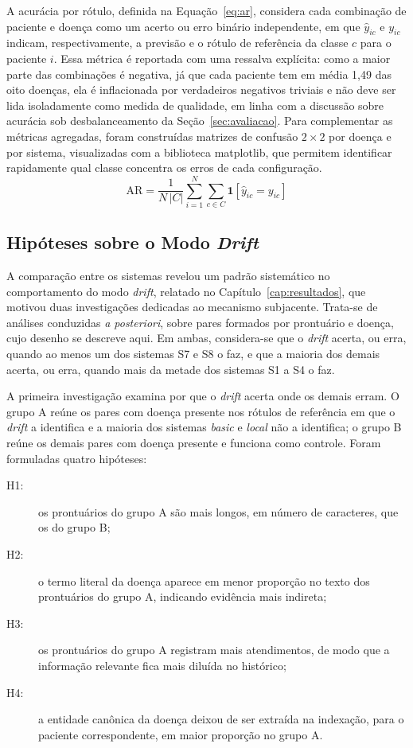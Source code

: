A acurácia por rótulo, definida na Equação~\eqref{eq:ar}, considera cada combinação de paciente e doença como um acerto ou erro binário independente, em que $\hat{y}_{ic}$ e $y_{ic}$ indicam, respectivamente, a previsão e o rótulo de referência da classe $c$ para o paciente $i$. Essa métrica é reportada com uma ressalva explícita: como a maior parte das combinações é negativa, já que cada paciente tem em média 1,49 das oito doenças, ela é inflacionada por verdadeiros negativos triviais e não deve ser lida isoladamente como medida de qualidade, em linha com a discussão sobre acurácia sob desbalanceamento da Seção~\ref{sec:avaliacao}. Para complementar as métricas agregadas, foram construídas matrizes de confusão $2 \times 2$ por doença e por sistema, visualizadas com a biblioteca matplotlib, que permitem identificar rapidamente qual classe concentra os erros de cada configuração.
\begin{equation}
\mathrm{AR} = \frac{1}{N\,|C|}\sum_{i=1}^{N}\sum_{c \in C} \mathbf{1}\left[\hat{y}_{ic} = y_{ic}\right]
\label{eq:ar}
\end{equation}
\subsection{Hipóteses sobre o Modo \texorpdfstring{\textit{Drift}}{Drift}}\label{sec:met-hipoteses}

A comparação entre os sistemas revelou um padrão sistemático no comportamento do modo \textit{drift}, relatado no Capítulo~\ref{cap:resultados}, que motivou duas investigações dedicadas ao mecanismo subjacente. Trata-se de análises conduzidas \textit{a posteriori}, sobre pares formados por prontuário e doença, cujo desenho se descreve aqui. Em ambas, considera-se que o \textit{drift} acerta, ou erra, quando ao menos um dos sistemas S7 e S8 o faz, e que a maioria dos demais acerta, ou erra, quando mais da metade dos sistemas S1 a S4 o faz.

A primeira investigação examina por que o \textit{drift} acerta onde os demais erram. O grupo A reúne os pares com doença presente nos rótulos de referência em que o \textit{drift} a identifica e a maioria dos sistemas \textit{basic} e \textit{local} não a identifica; o grupo B reúne os demais pares com doença presente e funciona como controle. Foram formuladas quatro hipóteses:
\begin{description}
    \item[H1:] os prontuários do grupo A são mais longos, em número de caracteres, que os do grupo B;
    \item[H2:] o termo literal da doença aparece em menor proporção no texto dos prontuários do grupo A, indicando evidência mais indireta;
    \item[H3:] os prontuários do grupo A registram mais atendimentos, de modo que a informação relevante fica mais diluída no histórico;
    \item[H4:] a entidade canônica da doença deixou de ser extraída na indexação, para o paciente correspondente, em maior proporção no grupo A.
\end{description}

